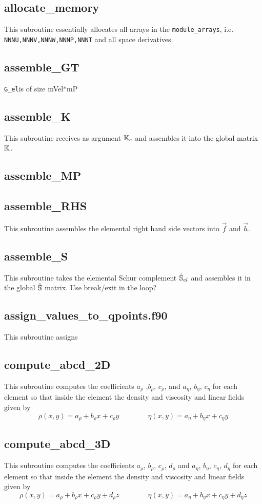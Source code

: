  \subsection{allocate\_memory}
 This subroutine essentially allocates all arrays in the {\tt module\_arrays}, i.e.
 {\tt NNNU,NNNV,NNNW,NNNP,NNNT} and all space derivatives.
 \subsection{assemble\_GT}
 {\tt G\_el}is of size mVel*mP
 \subsection{assemble\_K}
 This subroutine receives as argument ${\mathbb{K}}_e$ and assembles it into the global matrix ${\mathbb{K}}$.
 \subsection{assemble\_MP}

 \subsection{assemble\_RHS}
 This subroutine assembles the elemental right hand side vectors into $\vec{f}$ and $\vec{h}$.
 \subsection{assemble\_S}
 This subroutine takes the elemental Schur complement $\hat{{\mathbb{S}}}_{el}$ and assembles
 it in the global $\hat{{\mathbb{S}}}$ matrix.
 Use break/exit in the loop?
 \subsection{assign\_values\_to\_qpoints.f90}
 This subroutine assigns 
 \subsection{compute\_abcd\_2D}
 This subroutine computes the coefficients $a_\rho$ ,$b_\rho$, $c_\rho$,
 and $a_\eta$, $b_\eta$, $c_\eta$ for each element so that 
 inside the element the density and viscosity and linear fields given by
 \[
 \rho(x,y)=a_\rho + b_\rho x + c_\rho y
 \qquad\qquad
 \eta(x,y)=a_\eta + b_\eta x + c_\eta y
 \]
 \subsection{compute\_abcd\_3D}
 This subroutine computes the coefficients $a_\rho$, $b_\rho$, $c_\rho$, $d_\rho$
 and $a_\eta$, $b_\eta$, $c_\eta$, $d_\eta$ for each element so that 
 inside the element the density and viscosity and linear fields given by
 \[
 \rho(x,y)=a_\rho + b_\rho x + c_\rho y + d_\rho z
 \qquad\qquad
 \eta(x,y)=a_\eta + b_\eta x + c_\eta y + d_\eta z
 \]

